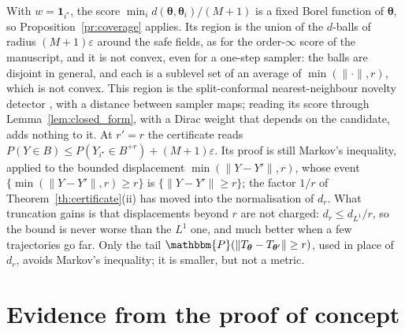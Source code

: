 \documentclass{article}
\newcommand{\PP}{\mathbbm{P}}
\newcommand{\bth}{\boldsymbol{\theta}}
\theoremstyle{plain}
\theoremstyle{remark}
\begin{document}
With $w=\mathbf 1_{i^\star}$, the score $\min_id(\bth,\bth_i)/(M+1)$ is a fixed Borel function of $\bth$, so
Proposition~\ref{pr:coverage} applies. Its region is the union of the $d$-balls of radius $(M+1)\varepsilon$ around the safe
fields, as for the order-$\infty$ score of the manuscript, and it is not convex, even for a one-step sampler: the balls are
disjoint in general, and each is a sublevel set of an average of $\min(\|\cdot\|,r)$, which is not convex. This region is the
split-conformal nearest-neighbour novelty detector \citep{laxhammar2015inductive,bates2023testing}, with a distance between sampler
maps; reading its score through Lemma~\ref{lem:closed_form}, with a Dirac weight that depends on the candidate, adds nothing to it.
At $r'=r$ the certificate reads $P(Y\in B)\le P(Y_{i^\star}\in B^{+r})+(M+1)\varepsilon$. Its proof is still Markov's inequality,
applied to the bounded displacement $\min(\|Y-Y'\|,r)$, whose event $\{\min(\|Y-Y'\|,r)\ge r\}$ is $\{\|Y-Y'\|\ge r\}$; the factor
$1/r$ of Theorem~\ref{th:certificate}(ii) has moved into the normalisation of $d_r$. What truncation gains is that displacements
beyond $r$ are not charged: $d_r\le d_{L^1}/r$, so the bound is never worse than the $L^1$ one, and much better when a few
trajectories go far. Only the tail $\PP(\|T_{\bth}-T_{\bth'}\|\ge r)$, used in place of $d_r$, avoids Markov's inequality; it is
smaller, but not a metric.

\section{Evidence from the proof of concept}\label{sec:evidence}
\end{document}
